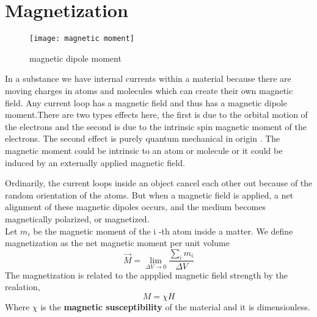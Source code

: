 \section{Magnetization}
\begin{wrapfigure}{r}{0.3\textwidth}
	\begin{center}
		\texttt{[image: magnetic moment]}
	\end{center}
	\caption{magnetic dipole moment}
\end{wrapfigure}
In a substance we have internal currents within a material because there are moving charges in atoms and molecules which can create their own magnetic field. Any current loop has a magnetic field and thus has a magnetic dipole moment.There are two types effects here, the first is due to the orbital motion of the electrons and the second is due to the intrinsic spin magnetic moment of the electrons. The second effect is purely quantum mechanical in origin . The magnetic moment could be intrinsic to an atom or molecule or it could be induced by an externally applied magnetic field. \par
Ordinarily, the current loops inside an object cancel each other out because of the random orientation of the atoms. But when a magnetic field is applied, a net alignment of these magnetic dipoles occurs, and the medium becomes magnetically polarized, or magnetized.
\\
Let ${m_{i}}$ be the magnetic moment of the $\mathrm{i}$ -th atom inside a matter. We define magnetization as the net magnetic moment per unit volume
$$
\vec{M}=\lim _{\Delta V \rightarrow 0} \frac{\sum_{i} {m_{i}}}{\Delta V}
$$
The magnetization is related to the appplied magnetic field strength by the realation,
\begin{equation}
M=\chi H
\end{equation}
Where $\chi$ is the \textbf{magnetic susceptibility} of the material and it is dimensionless.
